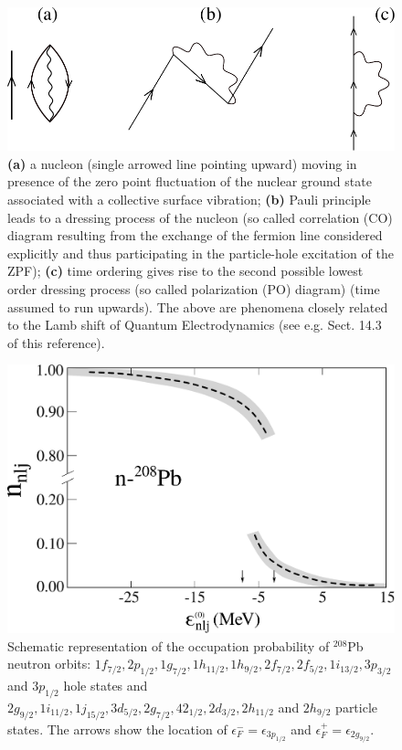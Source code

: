 \begin{figure}
	\centerline {
		\includegraphics*[width=12cm]{introduccion/figs/figpreface8}
	}
	\caption{\textbf{(a)} a nucleon (single arrowed line pointing upward) moving in presence of the zero point fluctuation of the nuclear ground state associated with a collective surface vibration; \textbf{(b)} Pauli principle leads to a dressing process of the nucleon (so called correlation (CO) diagram resulting from the exchange of the fermion line considered explicitly and thus participating in the particle-hole excitation of the ZPF); \textbf{(c)} time ordering gives rise to the second possible lowest order dressing  process (so called polarization (PO) diagram)  (time assumed to run upwards). The above are phenomena closely related to the Lamb shift of Quantum Electrodynamics (see e.g. \cite{Weinberg:96} Sect. 14.3 of this reference).}
	\label{fig1.0.8}
\end{figure}
\begin{figure}
	\centerline {
		\includegraphics*[width=12cm]{introduccion/figs/fig1_2_5}
	}
	\caption{Schematic representation of the occupation probability of $^{208}$Pb neutron orbits: $1f_{7/2},2p_{1/2},1g_{7/2},1h_{11/2},1h_{9/2},2f_{7/2},2f_{5/2},1i_{13/2},3p_{3/2}$ and $3p_{1/2}$ hole states and $2g_{9/2},1i_{11/2},1j_{15/2},3d_{5/2},2g_{7/2},42_{1/2},2d_{3/2},2h_{11/2}$ and $2h_{9/2}$ particle states. The arrows show the location of $\epsilon^-_F=\epsilon_{3p_{1/2}}$ and $\epsilon^+_F=\epsilon_{2g_{9/2}}$.}
	\label{fig1.2.5}
\end{figure}
